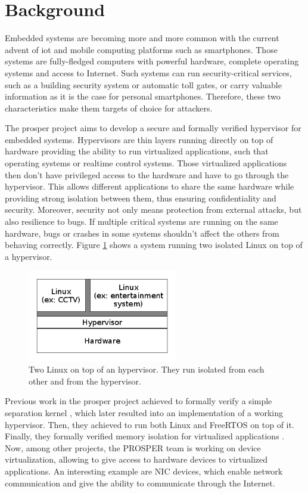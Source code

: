 \documentclass{kththesis}
\begin{document}
\section{Background}

Embedded systems are becoming more and more common with the current advent of \Gls{iot} and mobile computing platforms such as smartphones. Those systems are fully-fledged computers with powerful hardware, complete operating systems and access to Internet. Such systems can run security-critical services, such as a building security system or automatic toll gates, or carry valuable information as it is the case for personal smartphones. Therefore, these two characteristics make them targets of choice for attackers.

The \gls{prosper} project \cite{noauthor_prosper:_nodate} aims to develop a secure and formally verified hypervisor for embedded systems. Hypervisors are thin layers running directly on top of hardware providing the ability to run virtualized applications, such that operating systems or realtime control systems. Those virtualized applications then don't have privileged access to the hardware and have to go through the hypervisor. This allows different applications to share the same hardware while providing strong isolation between them, thus ensuring confidentiality and security. Moreover, security not only means protection from external attacks, but also resilience to bugs. If multiple critical systems are running on the same hardware, bugs or crashes in some systems shouldn't affect the others from behaving correctly. Figure \ref{figure-hypervisor-simple} shows a system running two isolated Linux on top of a hypervisor.

\begin{figure}[ht]
	\includegraphics[height=4cm]{figures/figure-hypervisor-simple.png}
	\centering
	\caption{Two Linux on top of an hypervisor. They run isolated from each other and from the hypervisor.}
	\label{figure-hypervisor-simple}
\end{figure}

Previous work in the \acrshort{prosper} project achieved \cite{noauthor_prosper:_nodate-1} to formally verify a simple separation kernel \cite{dam_formal_2013}, which later resulted into an implementation of a working hypervisor. Then, they achieved to run both Linux and \gls{FreeRTOS} on top of it. Finally, they formally verified memory isolation for virtualized applications \cite{nemati_trustworthy_2015}. Now, among other projects, the PROSPER team is working on device virtualization, allowing to give access to hardware devices to virtualized applications. An interesting example are \gls{NIC} devices, which enable network communication and give the ability to communicate through the Internet.
\end{document}
